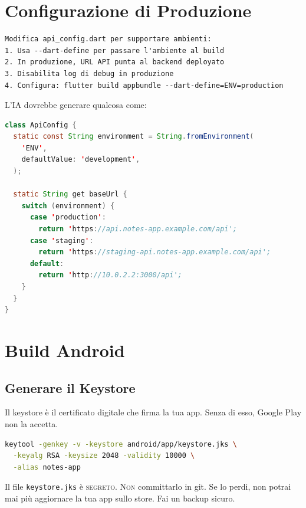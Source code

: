 \section{Configurazione di Produzione}

\begin{praticabox}[title={Pratica --- Ambiente di produzione}]
\begin{lstlisting}[language={}]
Modifica api_config.dart per supportare ambienti:
1. Usa --dart-define per passare l'ambiente al build
2. In produzione, URL API punta al backend deployato
3. Disabilita log di debug in produzione
4. Configura: flutter build appbundle --dart-define=ENV=production
\end{lstlisting}
\end{praticabox}

L'IA dovrebbe generare qualcosa come:

\begin{lstlisting}[language=Java,title={ApiConfig con ambienti}]
class ApiConfig {
  static const String environment = String.fromEnvironment(
    'ENV',
    defaultValue: 'development',
  );

  static String get baseUrl {
    switch (environment) {
      case 'production':
        return 'https://api.notes-app.example.com/api';
      case 'staging':
        return 'https://staging-api.notes-app.example.com/api';
      default:
        return 'http://10.0.2.2:3000/api';
    }
  }
}
\end{lstlisting}

\section{Build Android}

\subsection{Generare il Keystore}

Il keystore è il certificato digitale che firma la tua app. Senza di esso, Google Play non la accetta.

\begin{lstlisting}[language=bash]
keytool -genkey -v -keystore android/app/keystore.jks \
  -keyalg RSA -keysize 2048 -validity 10000 \
  -alias notes-app
\end{lstlisting}

\begin{warnbox}
Il file \texttt{keystore.jks} è \textsc{segreto}. \textsc{Non} committarlo in git. Se lo perdi, non potrai mai più aggiornare la tua app sullo store. Fai un backup sicuro.
\end{warnbox}

